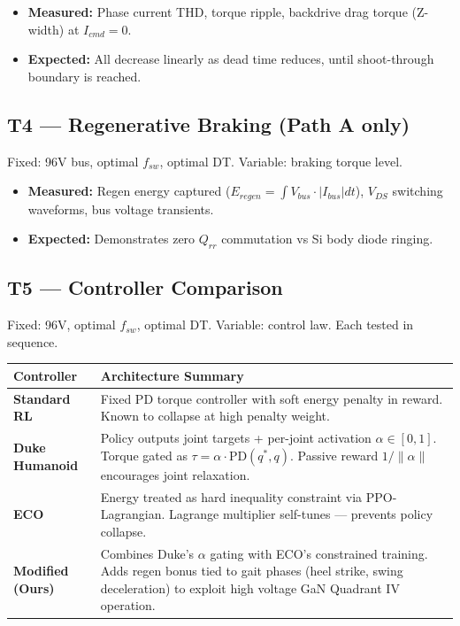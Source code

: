 \documentclass[11pt]{article}
\begin{document}
\begin{itemize}[noitemsep, topsep=0pt]
    \item \textbf{Measured:} Phase current THD, torque ripple, backdrive drag torque (Z-width) at $I_{cmd} = 0$.
    \item \textbf{Expected:} All decrease linearly as dead time reduces, until shoot-through boundary is reached.
\end{itemize}

\subsection*{T4 — Regenerative Braking (Path A only)}
Fixed: 96V bus, optimal $f_{sw}$, optimal DT. Variable: braking torque level.

\begin{itemize}[noitemsep, topsep=0pt]
    \item \textbf{Measured:} Regen energy captured ($E_{regen} = \int V_{bus} \cdot |I_{bus}| dt$), $V_{DS}$ switching waveforms, bus voltage transients.
    \item \textbf{Expected:} Demonstrates zero $Q_{rr}$ commutation vs Si body diode ringing.
\end{itemize}

\subsection*{T5 — Controller Comparison}
Fixed: 96V, optimal $f_{sw}$, optimal DT. Variable: control law. Each tested in sequence.

\vspace{0.2cm}
\noindent
\begin{tabularx}{\textwidth}{@{}l X@{}}
\toprule
\textbf{Controller} & \textbf{Architecture Summary} \\
\midrule
\textbf{Standard RL} & Fixed PD torque controller with soft energy penalty in reward. Known to collapse at high penalty weight. \\
\textbf{Duke Humanoid} & Policy outputs joint targets + per-joint activation $\alpha \in [0,1]$. Torque gated as $\tau = \alpha \cdot \text{PD}(q^*, q)$. Passive reward $1/\|\alpha\|$ encourages joint relaxation. \\
\textbf{ECO} & Energy treated as hard inequality constraint via PPO-Lagrangian. Lagrange multiplier self-tunes — prevents policy collapse. \\
\textbf{Modified (Ours)} & Combines Duke's $\alpha$ gating with ECO's constrained training. Adds regen bonus tied to gait phases (heel strike, swing deceleration) to exploit high voltage GaN Quadrant IV operation. \\
\bottomrule
\end{tabularx}
\end{document}
